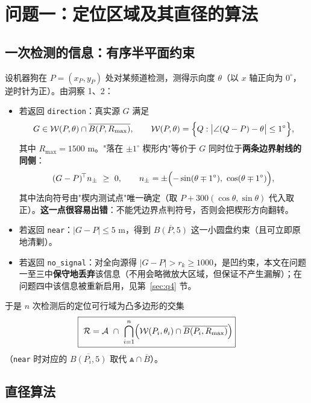 \section{问题一：定位区域及其直径的算法}

\subsection{一次检测的信息：有序半平面约束}

设机器狗在 $P=(x_P,y_P)$ 处对某频道检测，测得示向度 $\theta$（以 $x$ 轴正向为 $0^\circ$，逆时针为正）。由洞察 1、2：

\begin{itemize}
  \item 若返回 \texttt{direction}：真实源 $G$ 满足
  \begin{equation}
  G\in\mathcal{W}(P,\theta)\cap\overline{B(P,R_{\max})},\qquad
  \mathcal{W}(P,\theta)=\Bigl\{Q:\bigl|\angle(Q-P)-\theta\bigr|\le 1^\circ\Bigr\},
  \end{equation}
  其中 $R_{\max}=1500$ m。"落在 $\pm1^\circ$ 楔形内"等价于 $G$ 同时位于\textbf{两条边界射线的同侧}：
  \begin{equation}
  (G-P)^{\!\top} n_\pm\ \ge\ 0,\qquad
  n_\pm=\pm\Bigl(-\sin(\theta\mp1^\circ),\ \cos(\theta\mp1^\circ)\Bigr),
  \label{eq:wedge}
  \end{equation}
  其中法向符号由"楔内测试点"唯一确定（取 $P+300(\cos\theta,\sin\theta)$ 代入取正）。\textbf{这一点很容易出错}：不能凭边界点判符号，否则会把楔形方向翻转。
  \item 若返回 \texttt{near}：$|G-P|\le5$ m，得到 $\overline{B(P,5)}$ 这一小圆盘约束（且可立即原地清剿）。
  \item 若返回 \texttt{no\_signal}：对全向源得 $|G-P|>r_k\ge1000$，是凹约束，本文在问题一至三中\textbf{保守地丢弃}该信息（不用会略微放大区域，但保证不产生漏解）；在问题四中该信息被重新启用，见第~\ref{sec:q4} 节。
\end{itemize}

于是 $n$ 次检测后的定位可行域为凸多边形的交集
\begin{equation}
\boxed{\ \Reg=\Arena\ \cap\ \bigcap_{i=1}^{n}\Bigl(\Wedge(P_i,\theta_i)\cap\overline{B(P_i,R_{\max})}\Bigr)}
\label{eq:region}
\end{equation}
（\texttt{near} 时对应的 $\overline{B(P_i,5)}$ 取代 $\Wedge\cap\overline{B}$）。

\subsection{直径算法}

